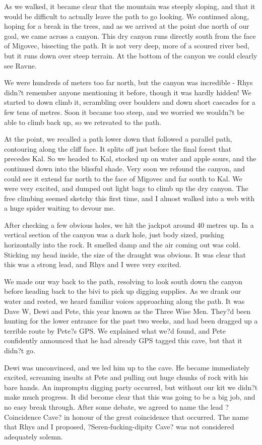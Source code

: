 \documentclass[onecolumn]{book}
\begin{document}
As we walked, it became clear that the mountain was steeply sloping, and that it would be difficult to actually leave the path to go looking. We continued along, hoping for a break in the trees, and as we arrived at the point due north of our goal, we came across a canyon. This dry canyon runs directly south from the face of Migovec, bisecting the path. It is not very deep, more of a scoured river bed, but it runs down over steep terrain. At the bottom of the canyon we could clearly see Ravne.

We were hundreds of meters too far north, but the canyon was incredible - Rhys didn?t remember anyone mentioning it before, though it was hardly hidden! We started to down climb it, scrambling over boulders and down short cascades for a few tens of metres. Soon it became too steep, and we worried we wouldn?t be able to climb back up, so we retreated to the path.

At the point, we recalled a path lower down that followed a parallel path, contouring along the cliff face. It splits off just before the final forest that precedes Kal. So we headed to Kal, stocked up on water and apple sours, and the continued down into the blissful shade. Very soon we refound the canyon, and could see it extend far north to the face of Migovec and far south to Kal. We were very excited, and dumped out light bags to climb up the dry canyon. The free climbing seemed sketchy this first time, and I almost walked into a web with a huge spider waiting to devour me. 

After checking a few obvious holes, we hit the jackpot around 40 metres up. In a vertical section of the canyon was a dark hole, just body sized, pushing horizontally into the rock. It smelled damp and the air coming out was cold. Sticking my head inside, the size of the draught was obvious. It was clear that this was a strong lead, and Rhys and I were very excited.

We made our way back to the path, resolving to look south down the canyon before heading back to the bivi to pick up digging supplies. As we drank our water and rested, we heard familiar voices approaching along the path. It was Dave W, Dewi and Pete, this year known as the Three Wise Men. They?d been hunting for the lower entrance for the past two weeks, and had been dragged up a terrible route by Pete?s GPS. We explained what we?d found, and Pete confidently announced that he had already GPS tagged this cave, but that it didn?t go.

Dewi was unconvinced, and we led him up to the cave. He became immediately excited, screaming insults at Pete and pulling out huge chunks of rock with his bare hands. An impromptu digging party occurred, but without our kit we didn?t make much progress. It did become clear that this was going to be a big job, and no easy break through. After some debate, we agreed to name the lead ?Coincidence Cave? in honour of the great coincidence that occurred. The name that Rhys and I proposed, ?Seren-fucking-dipity Cave? was not considered adequately solemn.
\end{document}
